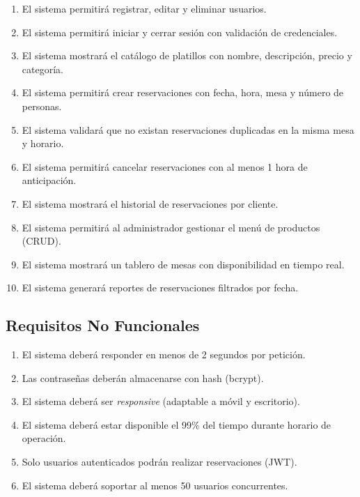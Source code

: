 \documentclass[12pt,a4paper]{article}
\begin{document}
\begin{enumerate}[label=\textbf{RF-\arabic*:}, leftmargin=2.8cm]
  \item El sistema permitirá registrar, editar y eliminar usuarios.
  \item El sistema permitirá iniciar y cerrar sesión con validación de credenciales.
  \item El sistema mostrará el catálogo de platillos con nombre, descripción, precio y categoría.
  \item El sistema permitirá crear reservaciones con fecha, hora, mesa y número de personas.
  \item El sistema validará que no existan reservaciones duplicadas en la misma mesa y horario.
  \item El sistema permitirá cancelar reservaciones con al menos 1 hora de anticipación.
  \item El sistema mostrará el historial de reservaciones por cliente.
  \item El sistema permitirá al administrador gestionar el menú de productos (CRUD).
  \item El sistema mostrará un tablero de mesas con disponibilidad en tiempo real.
  \item El sistema generará reportes de reservaciones filtrados por fecha.
\end{enumerate}

\subsection{Requisitos No Funcionales}

\begin{enumerate}[label=\textbf{RNF-\arabic*:}, leftmargin=2.8cm]
  \item El sistema deberá responder en menos de 2 segundos por petición.
  \item Las contraseñas deberán almacenarse con hash (bcrypt).
  \item El sistema deberá ser \textit{responsive} (adaptable a móvil y escritorio).
  \item El sistema deberá estar disponible el 99\% del tiempo durante horario de operación.
  \item Solo usuarios autenticados podrán realizar reservaciones (JWT).
  \item El sistema deberá soportar al menos 50 usuarios concurrentes.
\end{enumerate}

\end{document}
